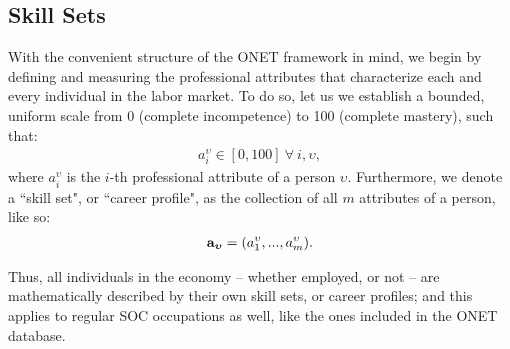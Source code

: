 \documentclass{article}
\begin{document}
\subsection{Skill Sets}
With the convenient structure of the ONET framework in mind, we begin by defining and measuring the professional attributes that characterize each and every individual in the labor market. To do so, let us we establish a bounded, uniform scale from 0 (complete incompetence) to 100 (complete mastery), such that: 
\begin{gather}
\label{eqn:attribute}
    a_{i}^{\upsilon} \in [0,100] \ \forall \ i, \upsilon
,\end{gather}
where $a_{i}^{\upsilon}$ is the $i$-th professional attribute of a person $\upsilon$. Furthermore, we denote a ``skill set", or ``career profile", as the collection of all $m$ attributes of a person, like so:
\begin{gather}
\label{eqn:skill_set}
    \vb{a_{\boldsymbol{\upsilon}}} = (a_{1}^{\upsilon}, ..., a_{m}^{\upsilon})
.\end{gather}

Thus, all individuals in the economy -- whether employed, or not -- are mathematically described by their own skill sets, or career profiles; and this applies to regular SOC occupations as well, like the ones included in the ONET database.

\end{document}
